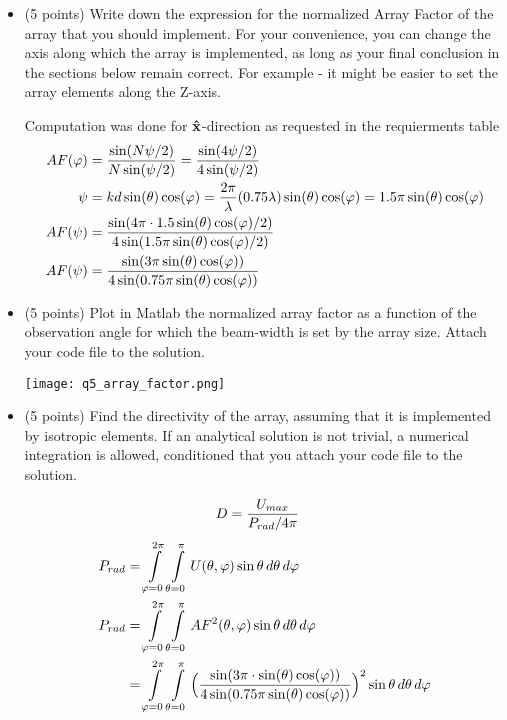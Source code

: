 \documentclass[12pt, letterpaper]{article}
\begin{document}
\begin{itemize}
  \item (5 points) Write down the expression for the normalized Array Factor of the array that you should implement. For your convenience, you can change the axis along which the array is implemented, as long as your final conclusion in the sections below remain correct. For example - it might be easier to set the array elements along the Z-axis.

  {\color{blue}Computation was done for $\vu{x}$-direction as requested in the requierments table}
  \begin{align}
    AF(\varphi)
    &=
    {
      \sin(N\psi/2)
      \over
      N\sin(\psi/2)
    }
    =
    {
      \sin(4\psi/2)
      \over
      4\sin(\psi/2)
    }
    \\
    \psi
    &=
    kd\sin(\theta)\cos(\varphi)
    =
    {2\pi\over\lambda}(0.75\lambda)\sin(\theta)\cos(\varphi)
    =
    1.5\pi\sin(\theta)\cos(\varphi)
    \\
    AF(\psi)
    &=
    {
      \sin(4\pi\cdot 1.5\sin(\theta)\cos(\varphi)/2)
      \over
      4\sin(1.5\pi\sin(\theta)\cos(\varphi)/2)
    }
    \\
    AF(\psi)
    &=
    {
      \sin(3\pi\sin(\theta)\cos(\varphi))
      \over
      4\sin(0.75\pi\sin(\theta)\cos(\varphi))
    }
  \end{align}

  \item (5 points) Plot in Matlab the normalized array factor as a function of the observation angle for which the beam-width is set by the array size. Attach your code file to the solution.
  
  \texttt{[image: q5\_array\_factor.png]}

  \item (5 points) Find the directivity of the array, assuming that it is implemented by isotropic elements. If an analytical solution is not trivial, a numerical integration is allowed, conditioned that you attach your code file to the solution.

  \begin{align}
    D
    &=
    {
      U_{max}
      \over
      P_{rad}/4\pi
    }
  \end{align}
  \begin{align}
    P_{rad}
    &=
    \int\limits_{\varphi=0}^{2\pi}\int\limits_{\theta=0}^{\pi}U(\theta,\varphi)\sin\theta \,d \theta\,d\varphi
    \\
    P_{rad}
    &=
    \int\limits_{\varphi=0}^{2\pi}\int\limits_{\theta=0}^{\pi}AF^2(\theta,\varphi)\sin\theta \,d \theta\,d\varphi
    \\
    &=
    \int\limits_{\varphi=0}^{2\pi}\int\limits_{\theta=0}^{\pi}
    \Big({
      \sin(3\pi\cdot \sin(\theta)\cos(\varphi))
      \over
      4\sin(0.75\pi\sin(\theta)\cos(\varphi))
    }\Big)^2\sin\theta \,d \theta\,d\varphi
  \end{align}


\end{itemize}
\end{document}
